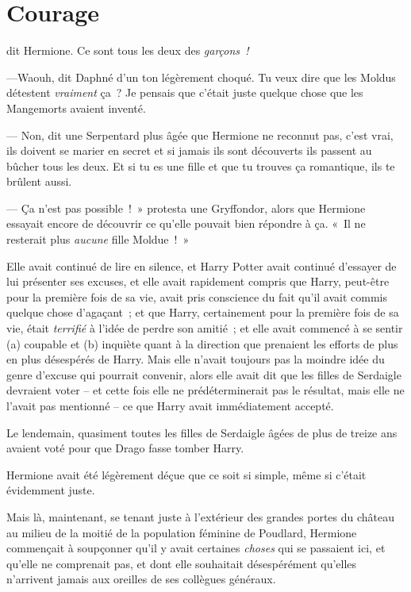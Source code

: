 \chapter{Courage}

 dit Hermione. Ce sont tous les deux des \emph{garçons~!}

\hplettrineextrapara
---Waouh, dit Daphné d'un ton légèrement choqué. Tu veux dire que les Moldus détestent \emph{vraiment} ça~? Je pensais que c'était juste quelque chose que les Mangemorts avaient inventé.

--- Non, dit une Serpentard plus âgée que Hermione ne reconnut pas, c'est vrai, ils doivent se marier en secret et si jamais ils sont découverts ils passent au bûcher tous les deux. Et si tu es une fille et que tu trouves ça romantique, ils te brûlent aussi.

--- Ça n'est pas possible~!~» protesta une Gryffondor, alors que Hermione essayait encore de découvrir ce qu'elle pouvait bien répondre à ça. «~Il ne resterait plus \emph{aucune} fille Moldue~!~»

Elle avait continué de lire en silence, et Harry Potter avait continué d'essayer de lui présenter ses excuses, et elle avait rapidement compris que Harry, peut-être pour la première fois de sa vie, avait pris conscience du fait qu'il avait commis quelque chose d'agaçant~; et que Harry, certainement pour la première fois de sa vie, était \emph{terrifié} à l'idée de perdre son amitié~; et elle avait commencé à se sentir (a) coupable et (b) inquiète quant à la direction que prenaient les efforts de plus en plus désespérés de Harry. Mais elle n'avait toujours pas la moindre idée du genre d'excuse qui pourrait convenir, alors elle avait dit que les filles de Serdaigle devraient voter -- et cette fois elle ne prédéterminerait pas le résultat, mais elle ne l'avait pas mentionné -- ce que Harry avait immédiatement accepté.

Le lendemain, quasiment toutes les filles de Serdaigle âgées de plus de treize ans avaient voté pour que Drago fasse tomber Harry.

Hermione avait été légèrement déçue que ce soit si simple, même si c'était évidemment juste.

Mais là, maintenant, se tenant juste à l'extérieur des grandes portes du château au milieu de la moitié de la population féminine de Poudlard, Hermione commençait à soupçonner qu'il y avait certaines \emph{choses} qui se passaient ici, et qu'elle ne comprenait pas, et dont elle souhaitait désespérément qu'elles n'arrivent jamais aux oreilles de ses collègues généraux.

